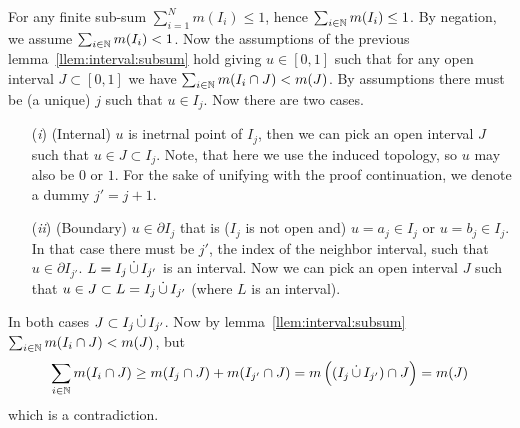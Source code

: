 \begin{thmproof}
For any finite sub-sum \(\sum_{i=1}^N m(I_i) \leq 1\), hence
\(\sum_{i\in\mathbb{N}} m(I_i)\leq 1\).
By negation, we assume \(\sum_{i\in\mathbb{N}} m(I_i)< 1\).
Now the assumptions of the previous lemma~\ref{llem:interval:subsum} hold
giving \(u\in[0,1]\) such that for any open interval \(J\subset[0,1]\) we have
\(\sum_{i\in\mathbb{N}} m(I_i \cap J) < m(J)\).
By assumptions there must be (a unique) $j$ such that \(u\in I_j\).
Now there are two cases.
\begin{itemize}
 \item[(\emph{i})]
   (Internal) $u$ is inetrnal point of \(I_j\), then
   we can pick an open interval $J$ such that \(u\in J \subset I_j\).
   Note, that here we use the induced topology, so $u$ may
   also be $0$ or $1$.
   For the sake of unifying with the proof continuation, we denote
   a dummy \(j' = j + 1\).
 \item[(\emph{ii})]
   (Boundary) \(u\in\partial I_j\) that is (\(I_j\) is not open and)
   \(u=a_j\in I_j\) or \(u=b_j\in I_j\).  In that case there must be
   \(j'\), the index of the neighbor interval, such that
   \(u\in\partial I_{j'}\).  \(L=I_j\disjunion I_{j'}\) is an
   interval.  Now we can pick an open interval $J$ such that
   \(u\in J\subset L=I_j\disjunion I_{j'}\) (where $L$ is an interval).
\end{itemize}
In both cases \(J \subset I_j \disjunion I_{j'}\).
Now by lemma~\ref{llem:interval:subsum} \(\sum_{i\in\mathbb{N}} m(I_i\cap J) < m(J)\),
but
\begin{equation*}
 \sum_{i\in\N} m(I_i\cap J)
 \geq   m(I_j \cap J) +  m(I_{j'} \cap J) \\
 =     m\left( (I_j \disjunion I_{j'}) \cap J\right)  = m(J)
\end{equation*}
which is a contradiction.
\end{thmproof}


